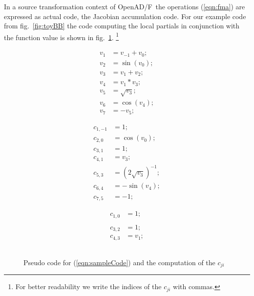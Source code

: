\documentclass{book}
\newcommand{\OpenADF}{OpenAD/F}
\newcommand{\reffig}[1]{{fig.~\ref{#1}}}
\newcommand{\refeqn}[1]{{(\ref{#1})}}
\begin{document}
In a source transformation context of \OpenADF\ the operations \refeqn{eqn:fma} are 
expressed as actual code, the Jacobian accumulation code. For our example code 
from \reffig{fig:toyBB} the code computing 
the local partials in conjunction with the function value 
is shown in 
\reffig{fig:toyAndPartials}.
\footnote{
  For better readability we write the indices of the $c_{ji}$ with commas.
} 
\begin{figure}
  \begin{center}
    \begin{minipage}{.3\linewidth}
      \begin{align*}
        v_1&=v_{-1}+v_0; \\
        v_2&=\sin(v_0); \\
        v_3&=v_1+v_2; \\
        v_4&=v_1*v_3; \\
        v_5&=\sqrt{v_3};\\
        v_6&=\cos(v_4); \\
        v_7&=-v_5;
      \end{align*}
    \end{minipage}
    \begin{minipage}{.3\linewidth}
      \begin{align*}
        c_{1,-1}&=1; \\
        c_{2,0}&=\cos(v_0); \\
        c_{3,1}&=1; \\
        c_{4,1}&=v_3; \\
        c_{5,3}&=(2\sqrt{v_3})^{-1}; \\
        c_{6,4}&=-\sin(v_4); \\
        c_{7,5}&=-1;
      \end{align*}
    \end{minipage}
    \begin{minipage}{.2\linewidth}
      \begin{align*}
        c_{1,0}&=1; \\
        &\\
        c_{3,2}&=1; \\
        c_{4,3}&=v_1; \\
        &\\
        &\\
        &
      \end{align*}
    \end{minipage}
  \end{center}	
  \caption{Pseudo code for \refeqn{eqn:sampleCode} and the computation of the $c_{ji}$}\label{fig:toyAndPartials}
\end{figure}
\end{document}
